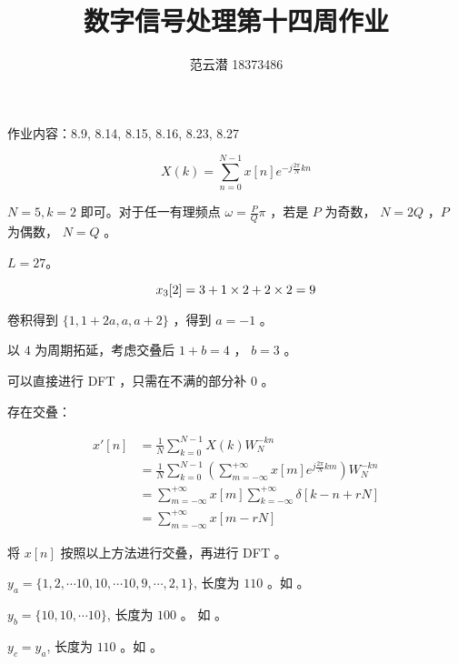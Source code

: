 \documentclass[lang=cn,11pt,a4paper,cite=authoryear]{elegantpaper}
\title{数字信号处理\quad 第十四周作业}
\author{范云潜 18373486}
\institute{微电子学院 184111 班}
\date{\zhtoday}
\begin{document}
\maketitle

作业内容：8.9, 8.14, 8.15, 8.16, 8.23, 8.27



\[X(k) = \sum_{n=0}^{N-1} x[n] e^{-j\frac{2\pi}{N} k n }\]

\(N=5, k=2\) 即可。对于任一有理频点 \(\omega = \frac{P}{Q}\pi\) ，若是 \(P\) 为奇数， \(N = 2Q\) ，\(P\) 为偶数， \(N=Q\) 。


\(L=27\)。


\[x_3[2] = 3 \time 1 + 1 \times 2 + 2 \times 2 = 9\]


卷积得到 \(\{1, 1 + 2 a, a, a + 2\}\) ，得到 \(a = -1\) 。


以 \(4\) 为周期拓延，考虑交叠后 \(1 + b = 4\) ， \(b = 3\) 。



可以直接进行 DFT ，只需在不满的部分补 \(0\) 。


存在交叠：

\[\begin{aligned}
    x'[n] &= \frac{1}{N} \sum_{k=0}^{N-1} X(k) W_N^{-k n} \\
    &= \frac{1}{N} \sum_{k=0}^{N-1} \left(\sum_{m=-\infty}^{+\infty}x[m] e^{j\frac{2\pi}{N} k m}\right) W_N^{-k n} \\ 
    &= \sum_{m=-\infty}^{+\infty} x[m] \sum_{k=-\infty}^{+\infty} \delta[k-n+rN] \\
    &= \sum_{m=-\infty}^{+\infty} x[m - r N]
\end{aligned}\]

将 \(x[n]\) 按照以上方法进行交叠，再进行 DFT 。



\(y_{a} = \{1,2,\cdots 10,10,\cdots 10,9,\cdots,2,1\}\), 长度为 \(110\) 。如  。



\(y_{b} = \{10, 10, \cdots 10\}\), 长度为 \(100\) 。
如  。




\(y_{c} = y_{a}\), 长度为 \(110\) 。如  。




\end{document}
